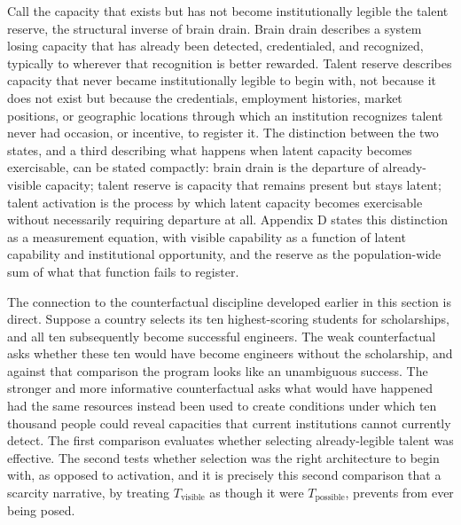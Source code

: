 \documentclass[11pt]{article}
\begin{document}
Call the capacity that exists but has not become institutionally legible the talent reserve, the structural inverse of brain drain. Brain drain describes a system losing capacity that has already been detected, credentialed, and recognized, typically to wherever that recognition is better rewarded. Talent reserve describes capacity that never became institutionally legible to begin with, not because it does not exist but because the credentials, employment histories, market positions, or geographic locations through which an institution recognizes talent never had occasion, or incentive, to register it. The distinction between the two states, and a third describing what happens when latent capacity becomes exercisable, can be stated compactly: brain drain is the departure of already-visible capacity; talent reserve is capacity that remains present but stays latent; talent activation is the process by which latent capacity becomes exercisable without necessarily requiring departure at all. Appendix D states this distinction as a measurement equation, with visible capability as a function of latent capability and institutional opportunity, and the reserve as the population-wide sum of what that function fails to register.

The connection to the counterfactual discipline developed earlier in this section is direct. Suppose a country selects its ten highest-scoring students for scholarships, and all ten subsequently become successful engineers. The weak counterfactual asks whether these ten would have become engineers without the scholarship, and against that comparison the program looks like an unambiguous success. The stronger and more informative counterfactual asks what would have happened had the same resources instead been used to create conditions under which ten thousand people could reveal capacities that current institutions cannot currently detect. The first comparison evaluates whether selecting already-legible talent was effective. The second tests whether selection was the right architecture to begin with, as opposed to activation, and it is precisely this second comparison that a scarcity narrative, by treating $T_{\text{visible}}$ as though it were $T_{\text{possible}}$, prevents from ever being posed.
\end{document}
